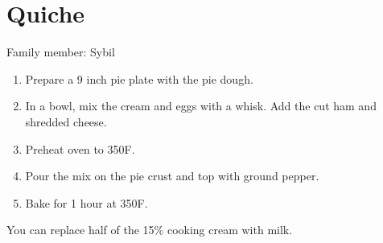 \chapter{Quiche}
\label{ch:hamquiche}



Family member: Sybil

\begin{enumerate}
    \item Prepare a 9 inch pie plate with the pie dough.
    \item In a bowl, mix the cream and eggs with a whisk. Add the cut ham and shredded cheese.
    \item Preheat oven to 350\degree F.
    \item Pour the mix on the pie crust and top with ground pepper.
    \item Bake for 1 hour at 350\degree F.
\end{enumerate}

You can replace half of the 15\% cooking cream with milk.
